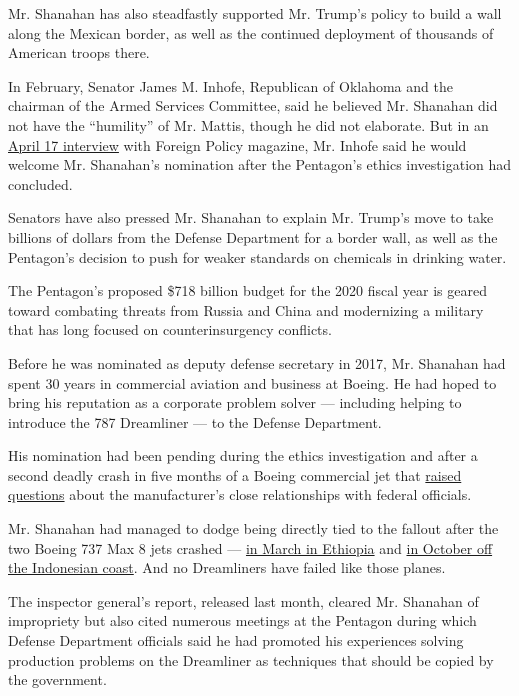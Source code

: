 Mr. Shanahan has also steadfastly supported Mr. Trump's policy to build
a wall along the Mexican border, as well as the continued deployment of
thousands of American troops there.

In February, Senator James M. Inhofe, Republican of Oklahoma and the
chairman of the Armed Services Committee, said he believed Mr. Shanahan
did not have the ``humility'' of Mr. Mattis, though he did not
elaborate. But in an
\href{https://foreignpolicy.com/2019/04/17/the-trials-of-patrick-shanahan-acting-defense-secretary-pentagon-trump-mattis-china-turkey/}{April
17 interview} with Foreign Policy magazine, Mr. Inhofe said he would
welcome Mr. Shanahan's nomination after the Pentagon's ethics
investigation had concluded.

Senators have also pressed Mr. Shanahan to explain Mr. Trump's move to
take billions of dollars from the Defense Department for a border wall,
as well as the Pentagon's decision to push for weaker standards on
chemicals in drinking water.

The Pentagon's proposed \$718 billion budget for the 2020 fiscal year is
geared toward combating threats from Russia and China and modernizing a
military that has long focused on counterinsurgency conflicts.

Before he was nominated as deputy defense secretary in 2017, Mr.
Shanahan had spent 30 years in commercial aviation and business at
Boeing. He had hoped to bring his reputation as a corporate problem
solver --- including helping to introduce the 787 Dreamliner --- to the
Defense Department.

His nomination had been pending during the ethics investigation and
after a second deadly crash in five months of a Boeing commercial jet
that
\href{https://www.nytimes.com/2019/03/26/us/politics/boeing-faa.html}{raised
questions} about the manufacturer's close relationships with federal
officials.

Mr. Shanahan had managed to dodge being directly tied to the fallout
after the two Boeing 737 Max 8 jets crashed ---
\href{https://www.nytimes.com/2019/04/04/world/asia/ethiopia-crash-boeing.html?module=inline}{in
March in Ethiopia} and
\href{https://www.nytimes.com/2019/02/03/world/asia/lion-air-plane-crash-pilots.html?module=inline}{in
October off the Indonesian coast}. And no Dreamliners have failed like
those planes.

The inspector general's report, released last month, cleared Mr.
Shanahan of impropriety but also cited numerous meetings at the Pentagon
during which Defense Department officials said he had promoted his
experiences solving production problems on the Dreamliner as techniques
that should be copied by the government.


